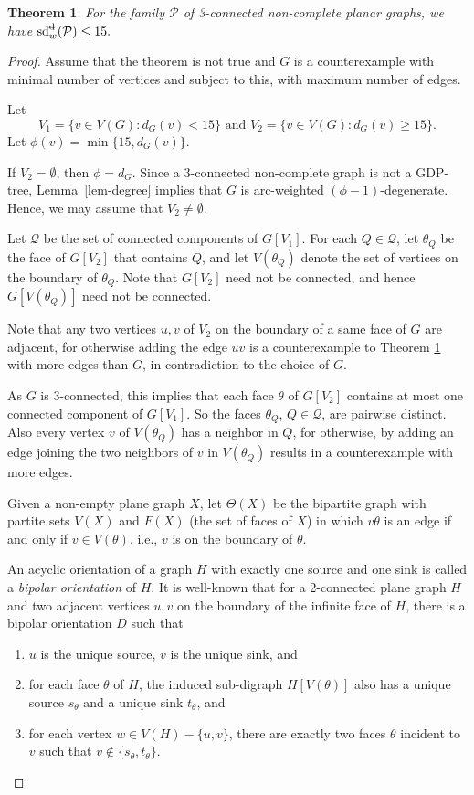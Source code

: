 \documentclass[11pt,a4paper]{article}
\newtheorem{theorem}{Theorem}
\theoremstyle{definition}
\begin{document}
\begin{theorem}
    \label{thm-stwdp}
    For the family  $  \mathcal{P}$ of 3-connected non-complete planar graphs, we have
     $\operatorname{sd}_w^{\text{\st{d}}}(\mathcal{P})  \le 15.$ 
\end{theorem}  
\begin{proof}
Assume that the theorem is not true and $G$ is a counterexample with minimal number of vertices and subject to this, with maximum  number of edges. 
 

Let $$V_1=\{v \in V(G): d_G(v) < 15\} \text{ and  } V_2 = \{v \in V(G): d_G(v) \ge 15\}.$$
Let $\phi(v)= \min \{15, d_G(v)\}.$  


If $V_2=\emptyset$, then $\phi=d_G$. Since a $3$-connected
non-complete graph is not a GDP-tree, Lemma~\ref{lem-degree} implies
that $G$ is arc-weighted $(\phi-1)$-degenerate. Hence, we may assume
that $V_2\ne\emptyset$.



Let $\mathcal{Q}$ be the set of connected components of $G[V_1]$.
For each $Q\in\mathcal{Q}$, let $\theta_Q$ be the face of   $G[V_2]$ that contains $Q$, and let $V(\theta_Q)$ denote the set of vertices on the boundary of $\theta_Q$. Note that $G[V_2]$ need not be connected, and hence $G[V(\theta_Q)]$ need not be connected. 

Note that any two vertices $u,v$ of $V_2$ on the boundary of a same face of $G$ are adjacent, for otherwise adding the edge $uv$ is a counterexample to Theorem \ref{thm-stwdp} with more edges than $G$, in contradiction to the choice of $G$.

 As $G$ is $3$-connected, this implies that 
each face $\theta$ of $G[V_2]$ contains at most one connected component of
$G[V_1]$. So the faces $\theta_Q$, $Q\in\mathcal{Q}$, are pairwise distinct. Also  
every vertex $v$ of $V(\theta_Q)$ has a neighbor in $Q$, for otherwise, by adding an edge joining the two neighbors of $v$ in $V(\theta_Q)$ results in a counterexample with more edges.

Given a non-empty plane graph $X$, let $\Theta(X)$ be the bipartite graph with partite sets $V(X)$ and $F(X)$ (the set of faces of $X$) in which $v\theta$ is an edge if and only if $v \in V(\theta)$, i.e., $v$ is on the boundary of $\theta$.

An acyclic orientation of a graph $H$  with exactly one source and one sink is called a {\em  bipolar orientation} of $H$. It is well-known \cite{LEC1967, FOR1995} that for a 2-connected plane graph $H$ and two adjacent vertices $u,v$ on the boundary of the infinite face of $H$, there is  a bipolar orientation $D$ such that 
\begin{enumerate}
    \item $u$ is the unique source, $v$ is the unique sink, and
    \item for   each face $\theta$ of $H$, the induced sub-digraph $H[V(\theta)]$ also has a unique source $s_{\theta}$ and a unique sink $t_{\theta}$, and 
    \item for each vertex $w \in V(H)-\{u,v\}$, 
    there are  exactly two faces $\theta$ incident to $v$ such that $v \notin \{s_\theta, t_\theta\}$. 
\end{enumerate}   


\end{proof}
\end{document}

